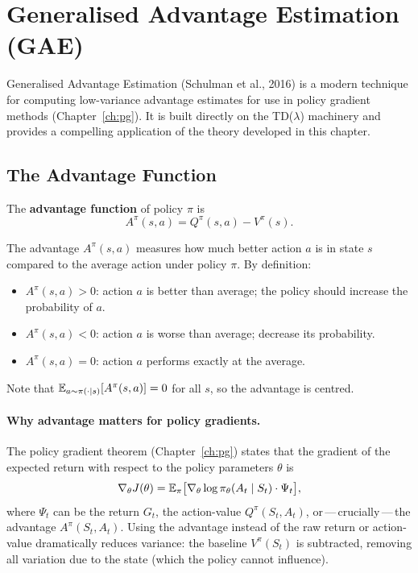 \section{Generalised Advantage Estimation (GAE)}
\label{sec:gae}

Generalised Advantage Estimation (Schulman et al., 2016) is a modern technique for computing low-variance advantage estimates for use in policy gradient methods (Chapter~\ref{ch:pg}).  It is built directly on the TD($\lambda$) machinery and provides a compelling application of the theory developed in this chapter.

\subsection{The Advantage Function}

\begin{definition}
\label{def:advantage}
The \textbf{advantage function} of policy $\pi$ is
\begin{equation}
\label{eq:advantage}
A^\pi(s,a) = Q^\pi(s,a) - V^\pi(s).
\end{equation}
\end{definition}

The advantage $A^\pi(s,a)$ measures how much better action $a$ is in state $s$ compared to the average action under policy $\pi$.  By definition:
\begin{itemize}[leftmargin=*]
  \item $A^\pi(s,a) > 0$: action $a$ is better than average; the policy should increase the probability of $a$.
  \item $A^\pi(s,a) < 0$: action $a$ is worse than average; decrease its probability.
  \item $A^\pi(s,a) = 0$: action $a$ performs exactly at the average.
\end{itemize}
Note that $\operatorname{\mathbb{E}}_{a\sim\pi(\cdot|s)}[A^\pi(s,a)] = 0$ for all $s$, so the advantage is centred.

\paragraph{Why advantage matters for policy gradients.}
The policy gradient theorem (Chapter~\ref{ch:pg}) states that the gradient of the expected return with respect to the policy parameters $\theta$ is
\[
\nabla_\theta J(\theta) = \operatorname{\mathbb{E}}_\pi\bigl[\nabla_\theta\log\pi_\theta(A_t\mid S_t)\cdot\Psi_t\bigr],
\]
where $\Psi_t$ can be the return $G_t$, the action-value $Q^\pi(S_t,A_t)$, or\,---\,crucially\,---\,the advantage $A^\pi(S_t,A_t)$.  Using the advantage instead of the raw return or action-value dramatically reduces variance: the baseline $V^\pi(S_t)$ is subtracted, removing all variation due to the state (which the policy cannot influence).

